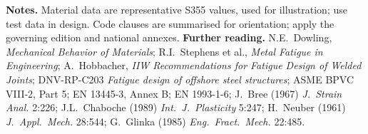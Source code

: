 \documentclass[10pt,a4paper]{article}
\begin{document}
{\footnotesize\color{cgray}
\textbf{Notes.} Material data are representative S355 values, used for illustration; use test data in design. Code clauses are summarised for orientation; apply the governing edition and national annexes.
\textbf{Further reading.} N.E.~Dowling, \emph{Mechanical Behavior of Materials}; R.I.~Stephens et al., \emph{Metal Fatigue in Engineering}; A.~Hobbacher, \emph{IIW Recommendations for Fatigue Design of Welded Joints}; DNV-RP-C203 \emph{Fatigue design of offshore steel structures}; ASME BPVC VIII-2, Part 5; EN 13445-3, Annex B; EN 1993-1-6; J.~Bree (1967) \emph{J.\ Strain Anal.} 2:226; J.L.~Chaboche (1989) \emph{Int.\ J.\ Plasticity} 5:247; H.~Neuber (1961) \emph{J.\ Appl.\ Mech.} 28:544; G.~Glinka (1985) \emph{Eng.\ Fract.\ Mech.} 22:485.\par}
\end{document}
